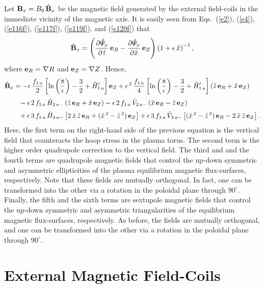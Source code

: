 \documentclass[12pt,prb,aps]{revtex4-1}
\begin{document}
Let ${\bf B}_x= B_0\,\hat{\bf B}_x$ be the magnetic field generated by the external field-coils in the immediate vicinity of the
magnetic axis. It is easily seen from Eqs.~(\ref{e2}), (\ref{e4}),  (\ref{e116f}), (\ref{e117f}), (\ref{e119f}), and (\ref{e120f})  that
\begin{equation}
\hat{\bf B}_x = \left(\frac{\partial\hat{\mit\Psi}_x}{\partial\hat{z}}\,{\bf e}_R-\frac{\partial\hat{\mit\Psi}_x}{\partial\hat{x}}\,{\bf e}_Z\right)\left(1+\epsilon\,\hat{x}\right)^{-1},
\end{equation}
where ${\bf e}_R =\nabla R$ and ${\bf e}_Z=\nabla Z$. Hence,
\begin{align}
\hat{\bf B}_x&= - \epsilon\,\frac{f_{1\,a}}{2}\left[\ln\left(\frac{8}{\epsilon}\right)-\frac{3}{2}+\hat{H}_{1\,a}'\right]{\bf e}_Z+ \epsilon^{\,2}\,\frac{f_{1\,a}}{4}\left[\ln\left(\frac{8}{\epsilon}\right)-\frac{3}{2}+\hat{H}_{1\,a}'\right](\hat{z}\,{\bf e}_R +\hat{x}\,{\bf e}_Z)\nonumber\\[0.5ex]
&\phantom{=} - \epsilon\,2\,f_{1\,a}\,\hat{H}_{2\,a-}\,(\hat{z}\,{\bf e}_R+\hat{x}\,{\bf e}_Z)
- \epsilon\,2\,f_{1\,a}\,\hat{V}_{2\,a-}\,(\hat{x}\,{\bf e}_R-\hat{z}\,{\bf e}_Z)\\[0.5ex]
&\phantom{=} + \epsilon\,3\,f_{1\,a}\,\hat{H}_{3\,a-}\left[2\,\hat{x}\,\hat{z}\,{\bf e}_R + (\hat{x}^{\,2}-\hat{z}^{\,2})\,{\bf e}_Z\right]
 + \epsilon\,3\,f_{1\,a}\,\hat{V}_{3\,a-}\left[ (\hat{x}^{\,2}-\hat{z}^{\,2})\,{\bf e}_R-2\,\hat{x}\,\hat{z}\,{\bf e}_Z\right].\nonumber
\end{align}
 Here, the first term on the 
right-hand side of the previous equation is the vertical field that counteracts the hoop stress in the plasma torus.\cite{greene,fred} The second term is the
higher order quadrupole correction to the vertical field. 
The third and and the fourth
terms are quadrupole magnetic fields that control the up-down symmetric and asymmetric ellipticities of the plasma equilibrium magnetic flux-surfaces, respectively.
Note that these fields are mutually orthogonal. In fact, one can be transformed into the other via a rotation in the poloidal plane through $90^\circ$. 
Finally, the fifth and the sixth terms are sextupole magnetic fields that control the  up-down symmetric and asymmetric triangularities of the equilibrium magnetic
flux-surfaces, respectively. As before, the fields are mutually orthogonal, and one can be transformed into the other via a rotation in the poloidal plane through $90^\circ$. 

\section{External Magnetic Field-Coils}\label{scoil}
\end{document}

